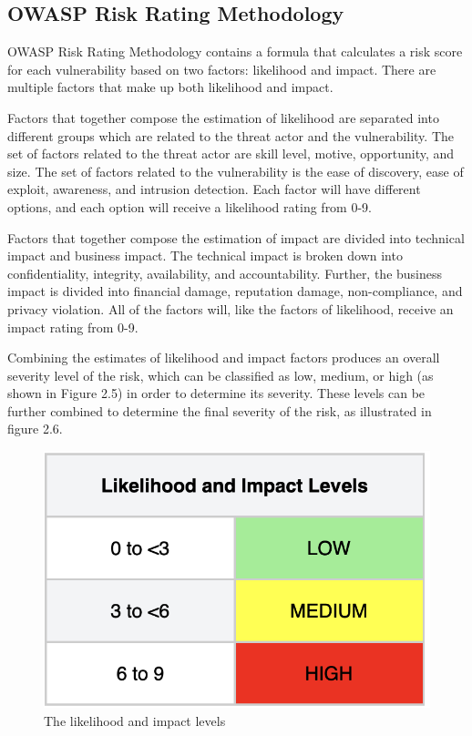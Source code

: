 \subsection{OWASP Risk Rating Methodology}
OWASP Risk Rating Methodology contains a formula that calculates a risk score for each vulnerability based on two factors: likelihood and impact. There are multiple factors that make up both likelihood and impact. 
 
Factors that together compose the estimation of likelihood are separated into different groups which are related to the threat actor and the vulnerability. The set of factors related to the threat actor are skill level, motive, opportunity, and size. The set of factors related to the vulnerability is the ease of discovery, ease of exploit, awareness, and intrusion detection. Each factor will have different options, and each option will receive a likelihood rating from 0-9. 

Factors that together compose the estimation of impact are divided into technical impact and business impact. The technical impact is broken down into confidentiality, integrity, availability, and accountability. Further, the business impact is divided into financial damage, reputation damage, non-compliance, and privacy violation. All of the factors will, like the factors of likelihood, receive an impact rating from 0-9. 

Combining the estimates of likelihood and impact factors produces an overall severity level of the risk, which can be classified as low, medium, or high (as shown in Figure 2.5) in order to determine its severity. These levels can be further combined to determine the final severity of the risk, as illustrated in figure 2.6.\cite{owasprisk}

\begin{figure}[H]
    \centering
    \includegraphics[scale=0.5]{Images/OWASP-likelihood.png}
    \caption{The likelihood and impact levels}
    \label{fig: Impact levels}
\end{figure}

